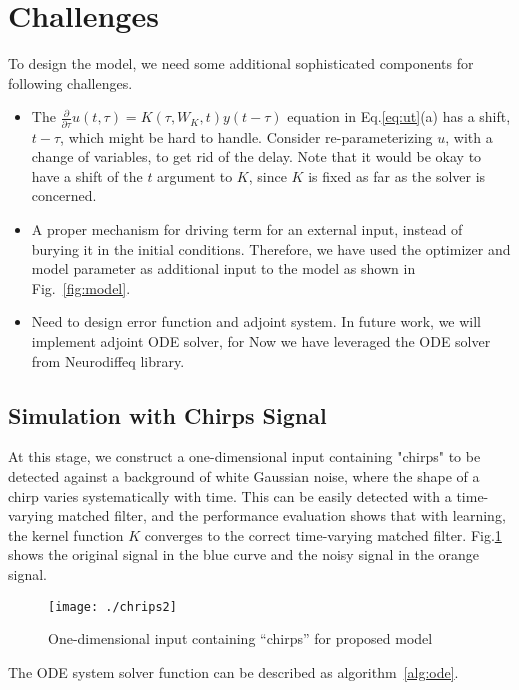 \documentclass{article}
\newcommand{\ppx}[1]{\frac{\partial}{\partial#1}}
\begin{document}
\section*{Challenges}
To design the model, we need some additional sophisticated components for following challenges.  
\begin{itemize}
\item The $\ppx{\tau}u(t,\tau) = K(\tau, W_K, t) y(t-\tau)$ equation in Eq.\eqref{eq:ut}(a) has a shift, $t-\tau$, which might be hard to handle. Consider re-parameterizing $u$, with a change of variables, to get rid of the delay. Note that it would be okay to have a shift of the $t$ argument to $K$, since $K$ is fixed as far as the solver is concerned. 


\item  A proper mechanism for driving term for an external input, instead of burying it in the initial conditions. Therefore, we have used the optimizer and model parameter as additional input to the model as shown in Fig.~\ref{fig:model}.

\item Need to design error function and adjoint system. In future work, we will implement adjoint ODE solver, for Now we have leveraged the ODE solver from Neurodiffeq \cite{chen2020neurodiffeq} library. 
\end{itemize}


\subsection*{Simulation with Chirps Signal}
At this stage, we construct a one-dimensional input containing "chirps" to be detected against a background of white Gaussian noise, where the shape of a chirp varies systematically with time. This can be easily detected with a time-varying matched filter, and the performance evaluation shows that with learning, the kernel function $K$ converges to the correct time-varying matched filter. Fig.\ref{fig:chrips} shows the original signal in the blue curve and the noisy signal in the orange signal. 

\begin{figure}[htb]
    \centering
    \texttt{[image: ./chrips2]}
    \caption{One-dimensional input containing “chirps” for proposed model}
    \label{fig:chrips}
\end{figure}

The ODE system solver function can be described as algorithm~\ref{alg:ode}.
\end{document}
